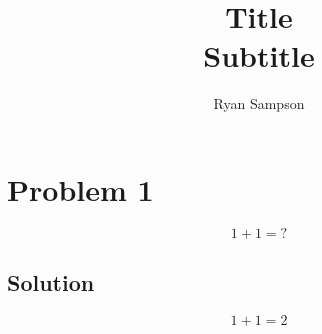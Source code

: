 \documentclass{article}
\title{\textbf{Title}\\Subtitle}
\author{Ryan Sampson}
\newcommand{\problem}[1]{\section*{Problem #1}}
\newcommand{\solution}{\subsection*{Solution}}
\begin{document}
\maketitle

\problem{1}
\[ 1 + 1 = ? \]
\solution
\[ 1 + 1 = 2 \]
\end{document}

